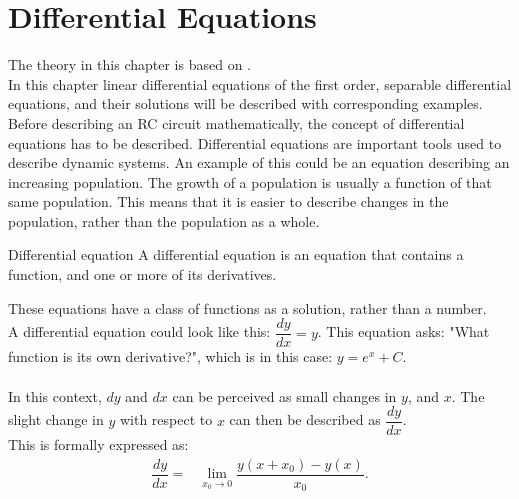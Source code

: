 \chapter{Differential Equations} 
The theory in this chapter is based on \cite{diffandcomplex}.\\ In this chapter linear differential equations of the first order, separable differential equations, and their solutions will be described with corresponding examples. \\

\noindent Before describing an RC circuit mathematically, the concept of differential equations has to be described. Differential equations are important tools used to describe dynamic systems. An example of this could be an equation describing an increasing population. The growth of a population is usually a function of that same population. This means that it is easier to describe changes in the population, rather than the population as a whole. \\


\begin{definition}{Differential equation}{}
A differential equation is an equation that contains a function, and one or more of its derivatives.
\end{definition}
\noindent%
These equations have a class of functions as a solution, rather than a number. 
\\
A differential equation could look like this: $\dfrac{dy}{dx} = y$. This equation asks: "What function is its own derivative?", which is in this case: $y=e^x+C$.
\\\\
In this context, $dy$ and $dx$ can be perceived as small changes in $y$, and $x$. The slight change in $y$ with respect to $x$ can then be described as $\dfrac{dy}{dx}$.
\\
This is formally expressed as:
\\
\begin{align*}
	\dfrac{dy}{dx} =& \lim_{x_0\to 0} \dfrac{y(x+x_0)-y(x)}{x_0}.
\end{align*}


